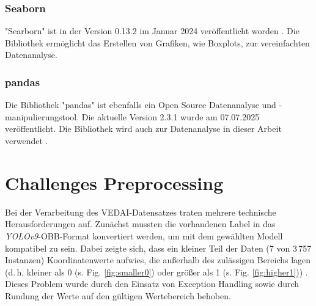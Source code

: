 \subsubsection*{Seaborn}
"Searborn" ist in der Version 0.13.2 im Januar 2024 veröffentlicht worden \cite{seaborn}. Die Bibliothek ermöglicht das Erstellen von Grafiken, wie Boxplots, zur vereinfachten Datenanalyse.
\subsubsection*{pandas}
Die Bibliothek "pandas" ist ebenfalls ein Open Source Datenanalyse und -manipulierungstool. Die aktuelle Version 2.3.1 wurde am 07.07.2025 veröffentlicht. Die Bibliothek wird auch zur Datenanalyse in dieser Arbeit verwendet \cite{pandas}.




\section{Challenges Preprocessing}
Bei der Verarbeitung des VEDAI-Datensatzes traten mehrere technische Herausforderungen auf. 
Zunächst mussten die vorhandenen Label in das \textit{YOLOv9}-OBB-Format konvertiert werden, um mit dem gewählten Modell kompatibel zu sein. 
Dabei zeigte sich, dass ein kleiner Teil der Daten (7 von 3\,757 Instanzen) Koordinatenwerte aufwies, die außerhalb des zulässigen Bereichs lagen (d.\,h. kleiner als 0 (s. Fig. \ref{fig:smaller0}) oder größer als 1 (s. Fig. \ref{fig:higher1})) . 
Dieses Problem wurde durch den Einsatz von Exception Handling sowie durch Rundung der Werte auf den gültigen Wertebereich behoben. 

